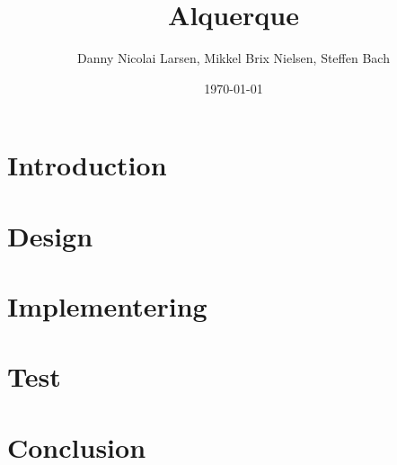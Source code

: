\documentclass[12pt, a4paper]{article}
\title{Alquerque}
\author{Danny Nicolai Larsen, Mikkel Brix Nielsen, Steffen Bach}
\date{\today}
\begin{document}
	\maketitle
	\tableofcontents
	\newpage
	\section{Introduction}
	\section{Design}
	\section{Implementering}
	\section{Test}
	\section{Conclusion}
\end{document}
